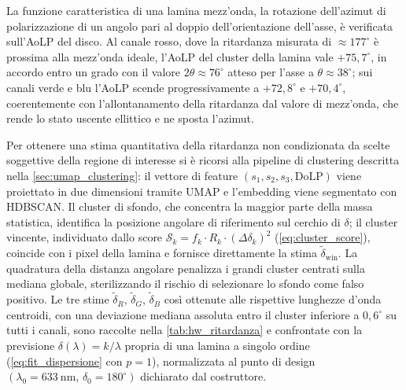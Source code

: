 La funzione caratteristica di una lamina mezz'onda, la rotazione dell'azimut di polarizzazione di un angolo pari al doppio dell'orientazione dell'asse, è verificata sull'AoLP del disco. Al canale rosso, dove la ritardanza misurata di $\approx 177^\circ$ è prossima alla mezz'onda ideale, l'AoLP del cluster della lamina vale $+75{,}7^\circ$, in accordo entro un grado con il valore $2\theta \approx 76^\circ$ atteso per l'asse a $\theta \approx 38^\circ$; sui canali verde e blu l'AoLP scende progressivamente a $+72{,}8^\circ$ e $+70{,}4^\circ$, coerentemente con l'allontanamento della ritardanza dal valore di mezz'onda, che rende lo stato uscente ellittico e ne sposta l'azimut.

Per ottenere una stima quantitativa della ritardanza non condizionata da scelte soggettive della regione di interesse si è ricorsi alla pipeline di clustering descritta nella \cref{sec:umap_clustering}: il vettore di feature $(s_1, s_2, s_3, \mathrm{DoLP})$ viene proiettato in due dimensioni tramite UMAP e l'embedding viene segmentato con HDBSCAN. Il cluster di sfondo, che concentra la maggior parte della massa statistica, identifica la posizione angolare di riferimento sul cerchio di $\delta$; il cluster vincente, individuato dallo score $\mathcal{S}_k = f_k \cdot R_k \cdot (\Delta\delta_k)^2$ (\cref{eq:cluster_score}), coincide con i pixel della lamina e fornisce direttamente la stima $\tilde\delta_{\mathrm{win}}$. La quadratura della distanza angolare penalizza i grandi cluster centrati sulla mediana globale, sterilizzando il rischio di selezionare lo sfondo come falso positivo. Le tre stime $\tilde\delta_R$, $\tilde\delta_G$, $\tilde\delta_B$ così ottenute alle rispettive lunghezze d'onda centroidi, con una deviazione mediana assoluta entro il cluster inferiore a $0{,}6^\circ$ su tutti i canali, sono raccolte nella \cref{tab:hw_ritardanza} e confrontate con la previsione $\delta(\lambda) = k/\lambda$ propria di una lamina a singolo ordine (\cref{eq:fit_dispersione} con $p=1$), normalizzata al punto di design $(\lambda_0 = \SI{633}{\nano\meter},\,\delta_0 = 180^\circ)$ dichiarato dal costruttore.

